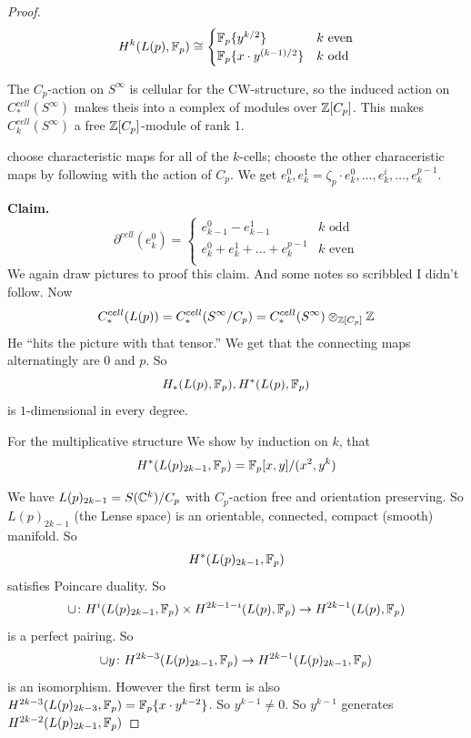 \documentclass[language=english]{TemplateLecture}
\begin{document}
\begin{proof}
    \[H^k(L(p), \mathbb{F}_p) \cong \begin{cases}
        \mathbb{F}_p\{y^{k/2}\} & k \text{ even} \\
        \mathbb{F}_p\{x\cdot y^{(k-1)/2}\} & k \text{ odd} \\
    \end{cases}\]

    The \(C_p\)-action on \(S^\infty\) is cellular for the CW-structure, so the induced action on \(C_*^{cell}(S^\infty)\) makes theis into a complex of modules over \(\mathbb{Z}[C_p]\). This makes \(C^{cell}_k(S^\infty)\) a free \(\mathbb{Z}[C_p]\)-module of rank 1.

    choose characteristic maps for all of the \(k\)-cells; chooste the other characeristic maps by following with the action of \(C_p\). We get \(e_k^0, e_k^1 = \zeta_p\cdot e^0_k, \dots, e_k^i, \dots, e_k^{p-1}\).

    \textbf{Claim.} 
    \[\partial^{cell}(e_k^0) = \begin{cases}
        e_{k-1}^0 - e_{k-1}^1 & k \text{ odd} \\
        e_k^0 + e_k^1 + \dots + e_k^{p-1} & k \text{ even} \\
    \end{cases}\]
    We again draw pictures to proof this claim. And some notes so scribbled I didn't follow. Now
    \[C^{cell}_*(L(p)) = C^{cell}_*(S^\infty/C_p) = C^{cell}_*(S^\infty)\otimes_{\mathbb{Z}[C_p]}\mathbb{Z}\]
    He \enquote{hits the picture with that tensor.} We get that the connecting maps alternatingly are \(0\) and \(p\).
    So
    \[H_*(L(p), \mathbb{F}_p), H^*(L(p), \mathbb{F}_p)\]
    is \(1\)-dimensional in every degree.
    
    For the multiplicative structure We show by induction on \(k\), that
    \[H^*(L(p)_{2k-1}, \mathbb{F}_p) = \mathbb{F}_p[x,y]/(x^2, y^k)\]

    We have \(L(p)_{2k-1}= S(\mathbb{C}^k)/{C_p}\) with \(C_p\)-action free and orientation preserving. So \(L(p)_{2k-1}\) (the Lense space) is an orientable, connected, compact (smooth) manifold. So
    \[H^*(L(p)_{2k-1}, \mathbb{F}_p)\]
    satisfies Poincare duality. So
    \[\cup\colon H^i(L(p)_{2k-1}, \mathbb{F}_p)\times H^{2k-1-i}(L(p), \mathbb{F}_p)\to H^{2k-1}(L(p), \mathbb{F}_p)\]
    is a perfect pairing. So
    \[\cup y\colon H^{2k-3}(L(p)_{2k-1}, \mathbb{F}_p)\to H^{2k-1}(L(p)_{2k-1}, \mathbb{F}_p)\]
    is an isomorphism. However the first term is also \(H^{2k-3}(L(p)_{2k-3}, \mathbb{F}_p) = \mathbb{F}_p\{x\cdot y^{k-2}\}\). So \(y^{k-1} \neq 0\). So \(y^{k-1}\) generates \(H^{2k-2}(L(p)_{2k-1}, \mathbb{F}_p)\)
\end{proof}
\end{document}
